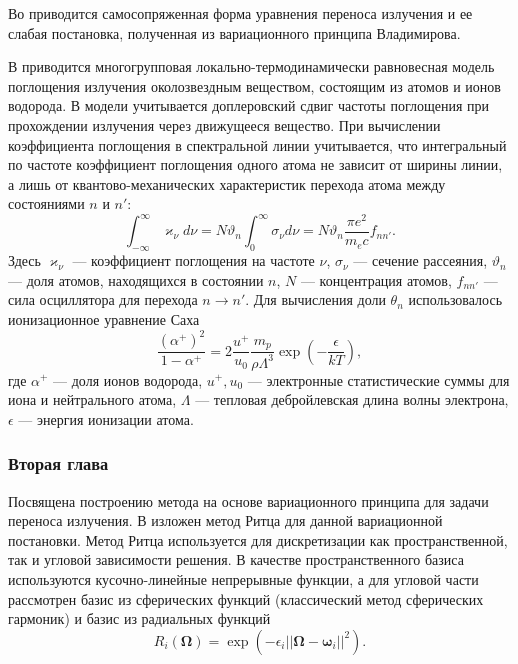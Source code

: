 Во  приводится самосопряженная форма уравнения переноса излучения и ее слабая постановка, полученная из вариационного принципа Владимирова. 

В  приводится многогрупповая локально-термодинамически равновесная модель поглощения излучения околозвездным веществом, состоящим из атомов и ионов водорода. В модели учитывается доплеровский сдвиг частоты поглощения при прохождении излучения через движущееся вещество. При вычислении коэффициента поглощения в спектральной линии учитывается, что интегральный по частоте коэффициент поглощения одного атома не зависит от ширины линии, а лишь от квантово-механических характеристик перехода атома между состояниями $n$ и $n'$:
\[
\int_{-\infty}^\infty \varkappa_\nu d\nu = N \vartheta_n \int_0^\infty \sigma_\nu d\nu = N \vartheta_n \frac{\pi e^2}{m_e c} f_{nn'}.
\]
Здесь $\varkappa_\nu$ --- коэффициент поглощения на частоте $\nu$, $\sigma_\nu$ --- сечение рассеяния, $\vartheta_n$ --- доля атомов, находящихся в состоянии $n$, $N$ --- концентрация атомов, $f_{nn'}$ --- сила осциллятора для перехода $n \to n'$. Для вычисления доли $\theta_n$ использовалось ионизационное уравнение Саха
\[
\frac{(\alpha^+)^2}{1 - \alpha^+} = 2 \frac{u^+}{u_0} \frac{m_p }{\rho\Lambda^3} \exp\left(-\frac{\epsilon}{kT}\right),
\]
где $\alpha^+$ --- доля ионов водорода, $u^+, u_0$ --- электронные статистические суммы для иона и нейтрального атома, $\Lambda$ --- тепловая дебройлевская длина волны электрона, $\epsilon$ --- энергия ионизации атома.


\subsubsection*{Вторая глава}
Посвящена построению метода на основе вариационного принципа для задачи переноса излучения. В  изложен метод Ритца для данной вариационной постановки. Метод Ритца используется для дискретизации как пространственной, так и угловой зависимости решения. В качестве пространственного базиса используются кусочно-линейные непрерывные функции, а для угловой части рассмотрен базис из сферических функций (классический метод сферических гармоник) и базис из радиальных функций
\[
R_i(\boldsymbol \Omega) = \exp (-\epsilon_i ||\boldsymbol \Omega - \boldsymbol \omega_i||^2).
\]


